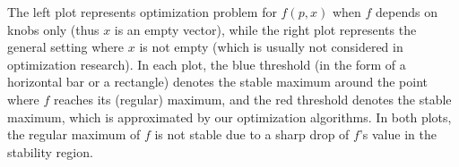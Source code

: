 \documentclass[a4paper,parskip=half]{article} %
\newcommand*\regmin[2]{\llfloor{#1}\rrfloor_{#2}}
\newcommand\todozk[1]{\textcolor{red}{#1}}
\newcommand*\todokk[2][]{\todo[color=purple!20,tickmarkheight=.2em,size=\scriptsize,#1]{KK: #2}}
\newcommand*\KK{\todokk}
\newcommand{\delete}[1]{}
\begin{document}
The left plot represents optimization problem for $f(p,x)$ when $f$ depends on knobs only (thus $x$ is an empty vector), while the right plot represents the general setting where $x$ is not empty (which is usually not considered in optimization research). In each plot, the blue threshold (in the form of a horizontal bar or a rectangle) denotes the stable maximum around the point where $f$ reaches its (regular) maximum, and the red threshold denotes the stable maximum, which is approximated by our optimization algorithms. In both plots, the regular maximum of $f$ is not stable due to a sharp drop of $f$'s value in the stability region. 
\delete{The right plot depicts the situation when input $x$ ranges in interval $[a, b]$, thus in \emph{max-min} optimization problem, formalized below in Formulas~\eqref{form:opt1}  and  \eqref{form:opt2}, the minimum of $f$ is calculated in the stability region of knobs $p$, with values of $x$ ranging in $[a,b]$.}


%
%
%
%
\end{document}
